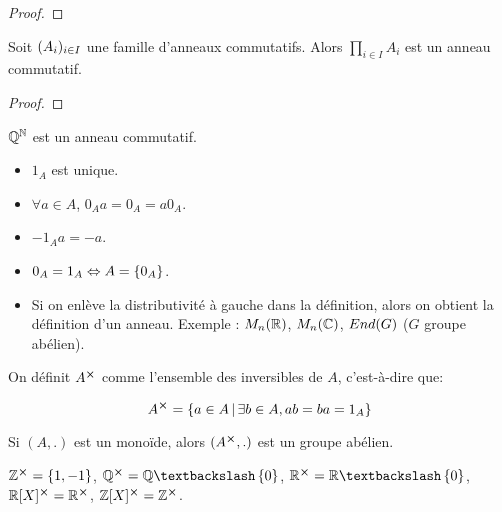 \ifdefined\outputproof
\begin{proof}

\end{proof}
\fi

\begin{proposition}
	Soit $(A_{i})_{i \in I}$ une famille d'anneaux commutatifs. Alors
	$\displaystyle \prod_{i \in I} A_{i}$ est un anneau commutatif.
\end{proposition}

\ifdefined\outputproof
\begin{proof}

\end{proof}
\fi

\begin{exemple}
	$\mathbb{Q}^{\mathbb{N}}$ est un anneau commutatif.
\end{exemple}

\begin{remarque}
	\begin{itemize}
		\item $1_{A}$ est unique.
		\item $\forall a \in A$, $0_{A} a = 0_{A} = a 0_{A}$.
		\item $-1_{A} a = -a$.
		\item $0_{A} = 1_{A} \Leftrightarrow A = \left\{ 0_{A} \right\}$.
		\item Si on enlève la distributivité à gauche dans la définition, alors
			on obtient la définition d'un anneau. Exemple : $M_{n}(\mathbb{R})$,
			$M_{n}(\mathbb{C})$, $End(G)$ ($G$ groupe abélien).
	\end{itemize}
\end{remarque}

\begin{definition}
	On définit $A^{\cross}$ comme l'ensemble des inversibles de $A$, c'est-à-dire
	que:

	\begin{equation*}
		A^{\cross} = \left\{a \in A \, | \, \exists b \in A, ab = ba = 1_{A} \right\}
	\end{equation*}
\end{definition}

\begin{remarque}
	Si $(A, .)$ est un monoïde, alors $(A^{\cross}, .)$ est un groupe
	abélien.
\end{remarque}

\begin{exemple}
	$\mathbb{Z}^{\cross} = \left\{ 1, -1 \right\}$, $\rational^{\cartprod} = \rational
	\textbackslash \GSset{0}$, $\real^{\cartprod} = \real \textbackslash
	\GSset{0}$, $\mathbb{R}[X]^{\cross} = \mathbb{R}^{\cross}$,
	$\mathbb{Z}[X]^{\cross} = \mathbb{Z}^{\cross}$.
\end{exemple}

